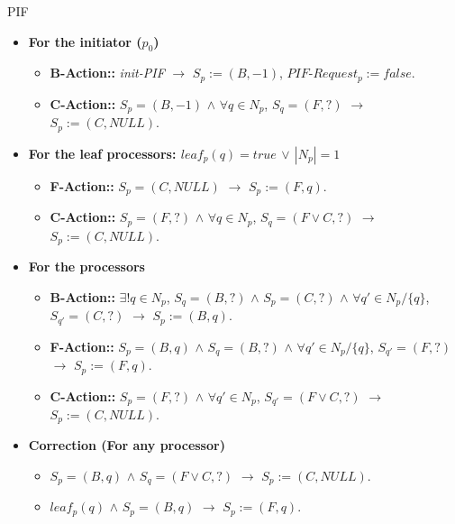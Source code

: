 \documentclass{llncs}
\begin{document}
\begin{algorithm}[htb]
\caption{PIF \label{algo:PIF}}
\begin{scriptsize}

   \begin{itemize}
       \item{\textbf{For the initiator ($p_0$)}}\begin{itemize}
                \item{\textbf{B-Action::}} \textit{init-PIF }$\rightarrow$ $S_{p}:=(B,-1)$, $PIF\mbox{-}Request_{p}:=false$.
                 \item{\textbf{C-Action::}} $S_{p}=(B,-1)$ $\wedge$  $\forall q \in N_{p}$, $S_{q}=(F,?)$ $\rightarrow$ $S_{p}:=(C,NULL)$.\\
                 \end{itemize}
        \item{\textbf{For the leaf processors: $leaf_{p}(q)=true$ $\vee$ $|N_{p}|=1$}} \begin{itemize}
                  \item{\textbf{F-Action::}}  $S_{p}=(C,NULL)$  $\rightarrow$ $S_{p}:=(F,q)$.
                  \item{\textbf{C-Action::}} $S_{p}=(F,?)$ $\wedge$ $\forall q \in N_{p}$, $S_{q}=(F \vee C,?)$  $\rightarrow$ $S_{p}:=(C,NULL)$. \\
                   \end{itemize}
          \item {\textbf{For the processors}}\begin{itemize}
                    \item{\textbf{B-Action::}}  $\exists ! q \in N_{p}$, $S_{q}=(B,?)$ $\wedge$  $ S_{p}=(C,?)$ $\wedge$  $\forall q' \in N_{p}/\{q\}$, $S_{q'} = (C,?)$ $\rightarrow$ $ S_{p}:=(B,q)$. 
                    \item{\textbf{F-Action::}} $S_{p}=(B,q)$ $\wedge$ $ S_{q}=(B,?)$ $\wedge$ $\forall q' \in N_{p}/\{q\}$, $S_{q'}=(F,?)$ $\rightarrow $ $S_{p}:=(F,q)$. 
                    \item{\textbf{C-Action::}} $S_{p}=(F,?)$ $\wedge$  $\forall q' \in N_{p}$, $S_{q'}=(F \vee C, ?)$  $\rightarrow$ $S_{p}:=(C,NULL)$. \\
                      \end{itemize}
            \item {\textbf{Correction (For any processor)}} \begin{itemize}
                        \item {$S_{p}=(B,q)$ $\wedge$ $S_{q}=(F \vee C,?)$  $\rightarrow$ $S_{p}:=(C,NULL)$.}
                        \item{$leaf_{p}(q)$ $\wedge$ $S_{p}=(B,q)$ $\rightarrow$ $S_{p}:=(F,q)$.}
                        \end{itemize}
   \end{itemize}
   \end{scriptsize}
\end{algorithm}
\end{document}
